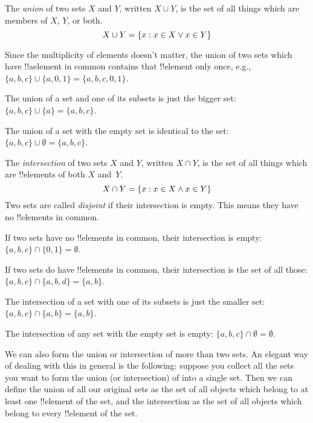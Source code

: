\documentclass[../../../include/open-logic-section]{subfiles}
\begin{document}

\begin{defn}
The \emph{union} of two sets $X$ and $Y$, written $X \cup Y$, is the
set of all things which are members of $X$, $Y$, or both.
\[
X \cup Y = \{ x : x \in X \lor x\in Y \}
\]
\end{defn}

\begin{ex}
Since the multiplicity of elements doesn't matter, the union of two
sets which have !!a{element} in common contains that !!{element} only once,
e.g., $\{ a, b, c\} \cup \{ a, 0, 1\} = \{a, b, c, 0, 1\}$.

The union of a set and one of its subsets is just the bigger set: $\{a,
b, c \} \cup \{a \} = \{a, b, c\}$.

The union of a set with the empty set is identical to the set: $\{a,
b, c \} \cup \emptyset = \{a, b, c \}$.
\end{ex}

\begin{defn}
The \emph{intersection} of two sets $X$ and $Y$, written $X \cap Y$, is
the set of all things which are !!{element}s of both $X$ and~$Y$.
\[
X \cap Y = \{ x : x \in X \land x\in Y \}
\]
Two sets are called \emph{disjoint} if their intersection is
empty. This means they have no !!{element}s in common.
\end{defn}

\begin{ex}
If two sets have no !!{element}s in common, their intersection is empty:
$\{ a, b, c\} \cap \{ 0, 1\} = \emptyset$.

If two sets do have !!{element}s in common, their intersection is the set of
all those: $\{a, b, c \} \cap \{a, b, d \} = \{a, b\}$.

The intersection of a set with one of its subsets is just the smaller
set: $\{a, b, c\} \cap \{a, b\} = \{a, b\}$.

The intersection of any set with the empty set is empty: $\{a, b, c \}
\cap \emptyset = \emptyset$.
\end{ex}

\begin{explain}
We can also form the union or intersection of more than two
sets. An elegant way of dealing with this in general is the
following: suppose you collect all the sets you want to form the union
(or intersection) of into a single set. Then we can define the union
of all our original sets as the set of all objects which belong to at
least one !!{element} of the set, and the intersection as the set of
all objects which belong to every !!{element} of the set.
\end{explain}
\end{document}
